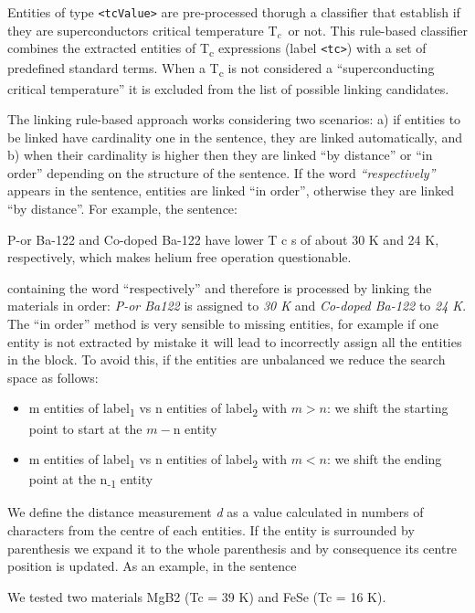 \documentclass{article}
\newcommand{\tc}{T$_{c}$}
\begin{document}
Entities of type \texttt{<tcValue>} are pre-processed thorugh a classifier that establish if they are superconductors critical temperature \tc~or not. 
This rule-based classifier combines the extracted entities of T\textsubscript{c} expressions (label \texttt{<tc>}) with a set of predefined standard terms. 
When a T\textsubscript{c} is not considered a ``superconducting critical temperature'' it is excluded from the list of possible linking candidates. 

The linking rule-based approach works considering two scenarios: a) if entities to be linked have cardinality one in the sentence, they are linked automatically, and b) when their cardinality is higher then they are linked ``by distance'' or ``in order'' depending on the structure of the sentence. 
If the word \textit{``respectively''} appears in the sentence, entities are linked ``in order'', otherwise they are linked ``by distance''. 
For example, the sentence:  
\begin{displayquote}
P-or Ba-122  and Co-doped Ba-122 have lower T c s of about 30 K and 24 K, respectively, which makes helium free operation questionable.
\end{displayquote}
containing the word ``respectively'' and therefore is processed by linking the materials in order: \textit{P-or Ba122} is assigned to \textit{30 K} and \textit{Co-doped Ba-122} to \textit{24 K}.
The ``in order'' method is very sensible to missing entities, for example if one entity is not extracted by mistake it will lead to incorrectly assign all the entities in the block. To avoid this, if the entities are unbalanced we reduce the search space as follows: 
\begin{itemize}
    \item m entities of label\textsubscript{1} vs n entities of label\textsubscript{2} with $m > n$: we shift the starting point to start at the $m - $n entity 
    \item m entities of label\textsubscript{1} vs n entities of label\textsubscript{2} with $m < n$: we shift the ending point at the n\textsubscript{-1} entity
\end{itemize}

We define the distance measurement \textit{d} as a value calculated in numbers of characters from the centre of each entities. 
If the entity is surrounded by parenthesis we expand it to the whole parenthesis and by consequence its centre position is updated. 
As an example, in the sentence
\begin{displayquote}
We tested two materials MgB2 (Tc = 39 K) and FeSe (Tc = 16 K).
\end{displayquote}
\end{document}
